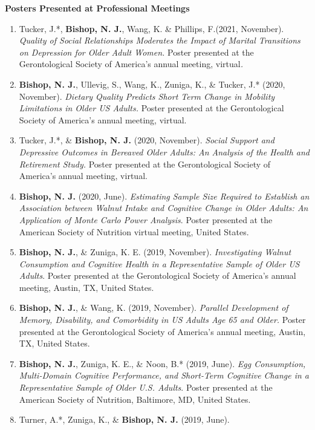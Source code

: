 \documentclass[
]{article}
\begin{document}
\textbf{Posters Presented at Professional Meetings}

\begin{enumerate}
\def\labelenumi{\arabic{enumi}.}
\item
  Tucker, J.*, \textbf{Bishop, N. J.}, Wang, K. \& Phillips, F.(2021,
  November). \emph{Quality of Social Relationships Moderates the Impact
  of Marital Transitions on Depression for Older Adult Women.} Poster
  presented at the Gerontological Society of America's annual meeting,
  virtual\emph{.}
\item
  \textbf{Bishop, N. J.}, Ullevig, S., Wang, K., Zuniga, K., \& Tucker,
  J.* (2020, November). \emph{Dietary Quality Predicts Short Term Change
  in Mobility Limitations in Older US Adults.} Poster presented at the
  Gerontological Society of America's annual meeting, virtual.
\item
  Tucker, J.*, \& \textbf{Bishop, N. J.} (2020, November). \emph{Social
  Support and Depressive Outcomes in Bereaved Older Adults: An Analysis
  of the Health and Retirement Study.} Poster presented at the
  Gerontological Society of America's annual meeting, virtual.
\item
  \textbf{Bishop, N. J.} (2020, June). \emph{Estimating Sample Size
  Required to Establish an Association between Walnut Intake and
  Cognitive Change in Older Adults: An Application of Monte Carlo Power
  Analysis}. Poster presented at the American Society of Nutrition
  virtual meeting, United States.
\item
  \textbf{Bishop, N. J.}, \& Zuniga, K. E. (2019, November).
  \emph{Investigating Walnut Consumption and Cognitive Health in a
  Representative Sample of Older US Adults}. Poster presented at the
  Gerontological Society of America's annual meeting, Austin, TX, United
  States.
\item
  \textbf{Bishop, N. J.}, \& Wang, K. (2019, November). \emph{Parallel
  Development of Memory, Disability, and Comorbidity in US Adults Age 65
  and Older.} Poster presented at the Gerontological Society of
  America's annual meeting, Austin, TX, United States.
\item
  \textbf{Bishop, N. J.}, Zuniga, K. E., \& Noon, B.* (2019, June).
  \emph{Egg Consumption, Multi-Domain Cognitive Performance, and
  Short-Term Cognitive Change in a Representative Sample of Older U.S.
  Adults}. Poster presented at the American Society of Nutrition,
  Baltimore, MD, United States.
\item
  Turner, A.*, Zuniga, K., \& \textbf{Bishop, N. J.} (2019, June).

\end{enumerate}
\end{document}
